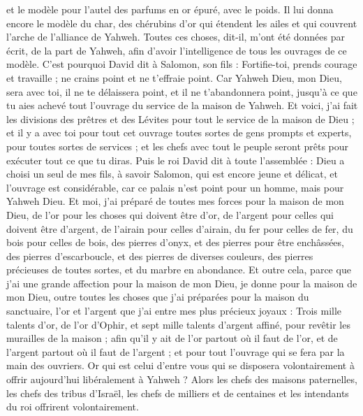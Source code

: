 \begin{multicols}{2}
et le modèle pour l'autel des parfums en or épuré, avec le poids. Il lui donna encore le modèle du char, des chérubins d'or qui étendent les ailes et qui couvrent l'arche de l'alliance de Yahweh.
Toutes ces choses, dit-il, m'ont été données par écrit, de la part de Yahweh, afin d'avoir l'intelligence de tous les ouvrages de ce modèle.
C'est pourquoi David dit à Salomon, son fils : Fortifie-toi, prends courage et travaille ; ne crains point et ne t'effraie point. Car Yahweh Dieu, mon Dieu, sera avec toi, il ne te délaissera point, et il ne t'abandonnera point, jusqu'à ce que tu aies achevé tout l'ouvrage du service de la maison de Yahweh.
Et voici, j'ai fait les divisions des prêtres et des Lévites pour tout le service de la maison de Dieu ; et il y a avec toi pour tout cet ouvrage toutes sortes de gens prompts et experts, pour toutes sortes de services ; et les chefs avec tout le peuple seront prêts pour exécuter tout ce que tu diras.
\VerseOne{}Puis le roi David dit à toute l'assemblée : Dieu a choisi un seul de mes fils, à savoir Salomon, qui est encore jeune et délicat, et l'ouvrage est considérable, car ce palais n'est point pour un homme, mais pour Yahweh Dieu.
Et moi, j'ai préparé de toutes mes forces pour la maison de mon Dieu, de l'or pour les choses qui doivent être d'or, de l'argent pour celles qui doivent être d'argent, de l'airain pour celles d'airain, du fer pour celles de fer, du bois pour celles de bois, des pierres d'onyx, et des pierres pour être enchâssées, des pierres d'escarboucle, et des pierres de diverses couleurs, des pierres précieuses de toutes sortes, et du marbre en abondance.
Et outre cela, parce que j'ai une grande affection pour la maison de mon Dieu, je donne pour la maison de mon Dieu, outre toutes les choses que j'ai préparées pour la maison du sanctuaire, l'or et l'argent que j'ai entre mes plus précieux joyaux :
Trois mille talents d'or, de l'or d'Ophir, et sept mille talents d'argent affiné, pour revêtir les murailles de la maison ;
afin qu'il y ait de l'or partout où il faut de l'or, et de l'argent partout où il faut de l'argent ; et pour tout l'ouvrage qui se fera par la main des ouvriers. Or qui est celui d'entre vous qui se disposera volontairement à offrir aujourd'hui libéralement à Yahweh ?
Alors les chefs des maisons paternelles, les chefs des tribus d'Israël, les chefs de milliers et de centaines et les intendants du roi offrirent volontairement.

\end{multicols}
